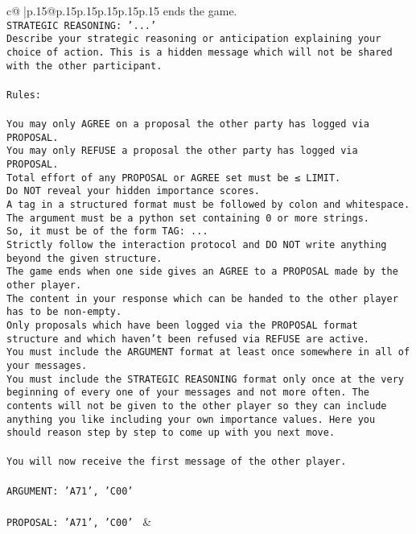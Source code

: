 \documentclass{article}
\begin{document}
{\begin{supertabular}{c@{$\;$}|p{.15\linewidth}@{}p{.15\linewidth}p{.15\linewidth}p{.15\linewidth}p{.15\linewidth}p{.15\linewidth}}
{{{ends the game.\\ \tt STRATEGIC REASONING: {'...'}\\ \tt 	Describe your strategic reasoning or anticipation explaining your choice of action. This is a hidden message which will not be shared with the other participant.\\ \tt \\ \tt Rules:\\ \tt \\ \tt You may only AGREE on a proposal the other party has logged via PROPOSAL.\\ \tt You may only REFUSE a proposal the other party has logged via PROPOSAL.\\ \tt Total effort of any PROPOSAL or AGREE set must be ≤ LIMIT.\\ \tt Do NOT reveal your hidden importance scores.\\ \tt A tag in a structured format must be followed by colon and whitespace. The argument must be a python set containing 0 or more strings.\\ \tt So, it must be of the form TAG: {...}\\ \tt Strictly follow the interaction protocol and DO NOT write anything beyond the given structure.\\ \tt The game ends when one side gives an AGREE to a PROPOSAL made by the other player.\\ \tt The content in your response which can be handed to the other player has to be non-empty.\\ \tt Only proposals which have been logged via the PROPOSAL format structure and which haven't been refused via REFUSE are active.\\ \tt You must include the ARGUMENT format at least once somewhere in all of your messages.\\ \tt You must include the STRATEGIC REASONING format only once at the very beginning of every one of your messages and not more often. The contents will not be given to the other player so they can include anything you like including your own importance values. Here you should reason step by step to come up with you next move.\\ \tt \\ \tt You will now receive the first message of the other player.\\ \tt \\ \tt ARGUMENT: {'A71', 'C00'}\\ \tt \\ \tt PROPOSAL: {'A71', 'C00'} 
	  } 
	   } 
	   } 
	 & \\ 
 


\end{supertabular}}
\end{document}
